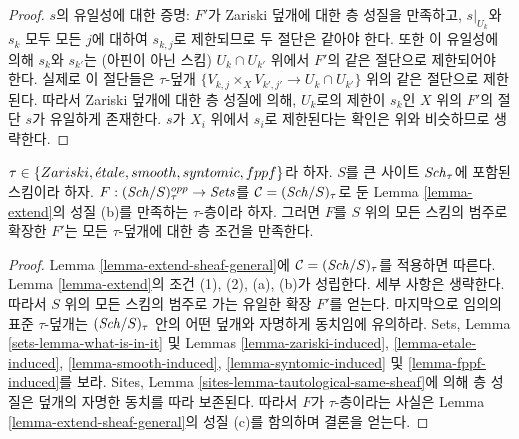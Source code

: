 \begin{proof}
\medskip\noindent
$s$의 유일성에 대한 증명: $F'$가 Zariski 덮개에 대한 층 성질을 만족하고,
$s|_{U_k}$와 $s_k$ 모두 모든 $j$에 대하여 $s_{k, j}$로 제한되므로
두 절단은 같아야 한다. 또한 이 유일성에 의해 $s_k$와
$s_{k'}$는 (아핀이 아닌 스킴) $U_k \cap U_{k'}$ 위에서 $F'$의 같은 절단으로
제한되어야 한다. 실제로 이 절단들은 $\tau$-덮개
$\{V_{k, j} \times_X V_{k', j'} \to U_k \cap U_{k'}\}$ 위의 같은 절단으로
제한된다. 따라서 Zariski 덮개에 대한 층 성질에 의해, $U_k$로의 제한이
$s_k$인 $X$ 위의 $F'$의 절단 $s$가 유일하게 존재한다. $s$가 $X_i$ 위에서
$s_i$로 제한된다는 확인은 위와 비슷하므로 생략한다.
\end{proof}

\begin{lemma}
\label{lemma-extend-sheaf}
$\tau \in \{Zariski, {\acute{e}tale}, smooth, syntomic, fppf\}$라 하자. $S$를 큰
사이트 $\mathit{Sch}_\tau$에 포함된 스킴이라 하자.
$F : (\mathit{Sch}/S)_\tau^{opp} \to \textit{Sets}$를
$\mathcal{C} = (\mathit{Sch}/S)_\tau$로 둔 Lemma \ref{lemma-extend}의 성질 (b)를
만족하는 $\tau$-층이라 하자. 그러면 $F$를 $S$ 위의 모든 스킴의 범주로
확장한 $F'$는 모든 $\tau$-덮개에 대한 층 조건을 만족한다.
\end{lemma}

\begin{proof}
Lemma \ref{lemma-extend-sheaf-general}에
$\mathcal{C} = (\mathit{Sch}/S)_\tau$를 적용하면 따른다. Lemma
\ref{lemma-extend}의 조건 (1), (2), (a), (b)가 성립한다. 세부 사항은
생략한다. 따라서 $S$ 위의 모든 스킴의 범주로 가는 유일한 확장 $F'$를
얻는다. 마지막으로 임의의 표준 $\tau$-덮개는 $(\mathit{Sch}/S)_\tau$ 안의 어떤
덮개와 자명하게 동치임에 유의하라. Sets, Lemma
\ref{sets-lemma-what-is-in-it} 및 Lemmas \ref{lemma-zariski-induced},
\ref{lemma-etale-induced},
\ref{lemma-smooth-induced},
\ref{lemma-syntomic-induced} 및
\ref{lemma-fppf-induced}를 보라. Sites, Lemma
\ref{sites-lemma-tautological-same-sheaf}에 의해 층 성질은 덮개의 자명한
동치를 따라 보존된다. 따라서 $F$가 $\tau$-층이라는 사실은 Lemma
\ref{lemma-extend-sheaf-general}의 성질 (c)를 함의하며 결론을 얻는다.
\end{proof}











